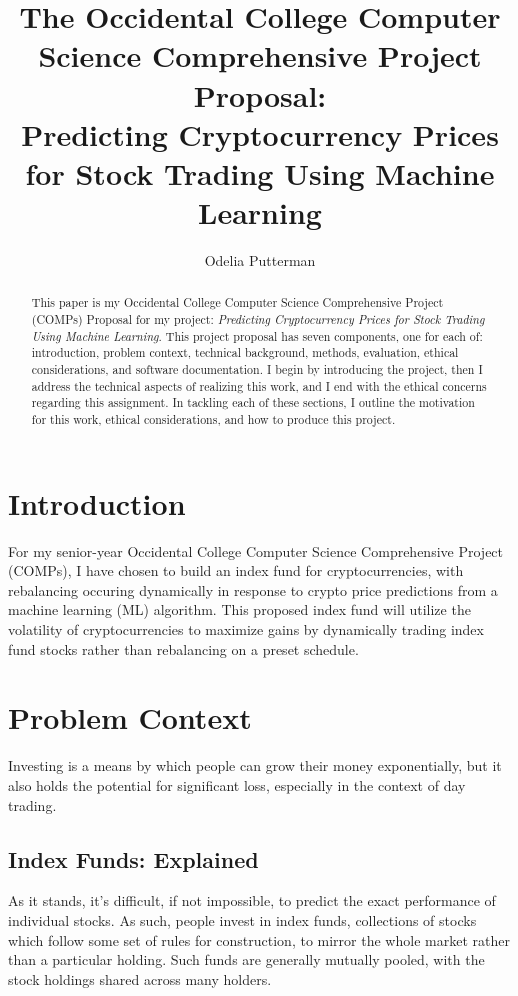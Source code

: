 \documentclass[10pt,twocolumn]{article}
\title{The Occidental College Computer Science Comprehensive Project Proposal: \\ Predicting Cryptocurrency Prices for Stock Trading Using Machine Learning}
\author{Odelia Putterman}
\affiliation{Occidental College}
\begin{document}
\maketitle

\begin{abstract}
    This paper is my Occidental College Computer Science Comprehensive Project (COMPs) Proposal for my project: \textit{Predicting Cryptocurrency Prices for Stock Trading Using Machine Learning}. This project proposal has seven components, one for each of: introduction, problem context, technical background, methods, evaluation, ethical considerations, and software documentation.  I begin by introducing the project, then I address the technical aspects of realizing this work, and I end with the ethical concerns regarding this assignment. In tackling each of these sections, I outline the motivation for this work, ethical considerations, and how to produce this project.
\end{abstract}


\section{Introduction}

For my senior-year Occidental College Computer Science Comprehensive Project (COMPs), I have chosen to build an index fund for cryptocurrencies, with rebalancing occuring dynamically in response to crypto price predictions from a machine learning (ML) algorithm. This proposed index fund will utilize the volatility of cryptocurrencies to maximize gains by dynamically trading index fund stocks rather than rebalancing on a preset schedule.

\section{Problem Context}

Investing is a means by which people can grow their money exponentially, but it also holds the potential for significant loss, especially in the context of day trading.

\subsection{Index Funds: Explained}

As it stands, it's difficult, if not impossible, to predict the exact performance of individual stocks. As such, people invest in index funds, collections of stocks which follow some set of rules for construction, to mirror the whole market rather than a particular holding. Such funds are generally mutually pooled, with the stock holdings shared across many holders.
\end{document}
